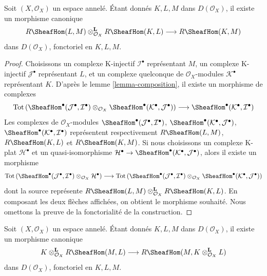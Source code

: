 \begin{lemma}

\label{lemma-internal-hom-composition}
Soit $(X, \mathcal{O}_X)$ un espace annelé. Étant donnés $K, L, M$ dans $D(\mathcal{O}_X)$, il existe un morphisme canonique $$
R\SheafHom(L, M) \otimes_{\mathcal{O}_X}^\mathbf{L} R\SheafHom(K, L)
\longrightarrow R\SheafHom(K, M)
$$ dans $D(\mathcal{O}_X)$, fonctoriel en $K, L, M$.
\end{lemma}

\begin{proof}

Choisissons un complexe K-injectif $\mathcal{I}^\bullet$ représentant $M$, un complexe K-injectif $\mathcal{J}^\bullet$ représentant $L$, et un complexe quelconque de $\mathcal{O}_X$-modules $\mathcal{K}^\bullet$ représentant $K$. D'après le lemme \ref{lemma-composition}, il existe un morphisme de complexes
$$
\text{Tot}\left(
\SheafHom^\bullet(\mathcal{J}^\bullet, \mathcal{I}^\bullet)
\otimes_{\mathcal{O}_X}
\SheafHom^\bullet(\mathcal{K}^\bullet, \mathcal{J}^\bullet)
\right)
\longrightarrow
\SheafHom^\bullet(\mathcal{K}^\bullet, \mathcal{I}^\bullet)
$$
Les complexes de $\mathcal{O}_X$-modules
$\SheafHom^\bullet(\mathcal{J}^\bullet, \mathcal{I}^\bullet)$,
$\SheafHom^\bullet(\mathcal{K}^\bullet, \mathcal{J}^\bullet)$,
$\SheafHom^\bullet(\mathcal{K}^\bullet, \mathcal{I}^\bullet)$
représentent respectivement $R\SheafHom(L, M)$, $R\SheafHom(K, L)$ et $R\SheafHom(K, M)$. Si nous choisissons un complexe K-plat $\mathcal{H}^\bullet$ et un quasi-isomorphisme
$\mathcal{H}^\bullet \to
\SheafHom^\bullet(\mathcal{K}^\bullet, \mathcal{J}^\bullet)$, alors il existe un morphisme
$$
\text{Tot}\left(
\SheafHom^\bullet(\mathcal{J}^\bullet, \mathcal{I}^\bullet)
\otimes_{\mathcal{O}_X} \mathcal{H}^\bullet
\right)
\longrightarrow
\text{Tot}\left(
\SheafHom^\bullet(\mathcal{J}^\bullet, \mathcal{I}^\bullet)
\otimes_{\mathcal{O}_X}
\SheafHom^\bullet(\mathcal{K}^\bullet, \mathcal{J}^\bullet)
\right)
$$
dont la source représente
$R\SheafHom(L, M) \otimes_{\mathcal{O}_X}^\mathbf{L} R\SheafHom(K, L)$. En composant les deux flèches affichées, on obtient le morphisme souhaité. Nous omettons la preuve de la fonctorialité de la construction.

\end{proof}

\begin{lemma}

\label{lemma-internal-hom-diagonal-better}
Soit $(X, \mathcal{O}_X)$ un espace annelé. Étant donnés $K, L, M$ dans $D(\mathcal{O}_X)$, il existe un morphisme canonique $$
K \otimes_{\mathcal{O}_X}^\mathbf{L} R\SheafHom(M, L)
\longrightarrow
R\SheafHom(M, K \otimes_{\mathcal{O}_X}^\mathbf{L} L)
$$ dans $D(\mathcal{O}_X)$, fonctoriel en $K, L, M$.
\end{lemma}

